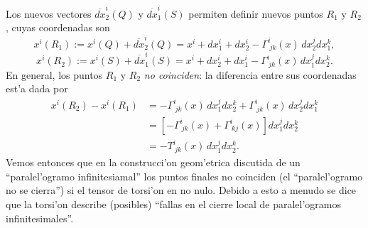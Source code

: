 Los nuevos vectores $\overline{dx}_2^i (Q)$ y $\overline{dx}_1^i (S)$ permiten definir nuevos puntos $R_1$ y $R_2$, cuyas coordenadas son
\begin{equation}
x^i(R_1):=x^i(Q)+\overline{dx}_2^i (Q)=x^i+dx_1^i+dx_2^i -\Gamma_{\ jk}^i(x)\, dx_2^j dx_1^k, 
\end{equation}
\begin{equation}
x^i(R_2):=x^i(S)+\overline{dx}_1^i (S)=x^i +dx_2^i +dx_1^i
 -\Gamma_{\ jk}^i(x)\, dx_1^j dx_2^k .
\end{equation}
En general, los puntos $R_1$ y $R_2$ \textit{no coinciden}: la diferencia entre sus coordenadas est'a dada por
\begin{align}
x^i(R_2)-x^i(R_1) &= -\Gamma_{\ jk}^i(x)\, dx_1^j dx_2^k+ \Gamma_{\ jk}^i(x)\, dx_2^j dx_1^k \\
&=  \left[-\Gamma_{\ jk}^i(x)+ \Gamma_{\ kj}^i(x)\right] dx_1^j dx_2^k \\
&=  -T_{\ jk}^i(x)\, dx_1^j dx_2^k .
\end{align}
Vemos entonces que en la construcci'on geom'etrica discutida de un ``paralel'ogramo infinitesiamal'' los puntos finales no coinciden (el ``paralel'ogramo no se cierra'') si el tensor de torsi'on en no nulo. Debido a esto a menudo se dice que la torsi'on describe (posibles) ``fallas en el cierre local de paralel'ogramos infinitesimales''.



